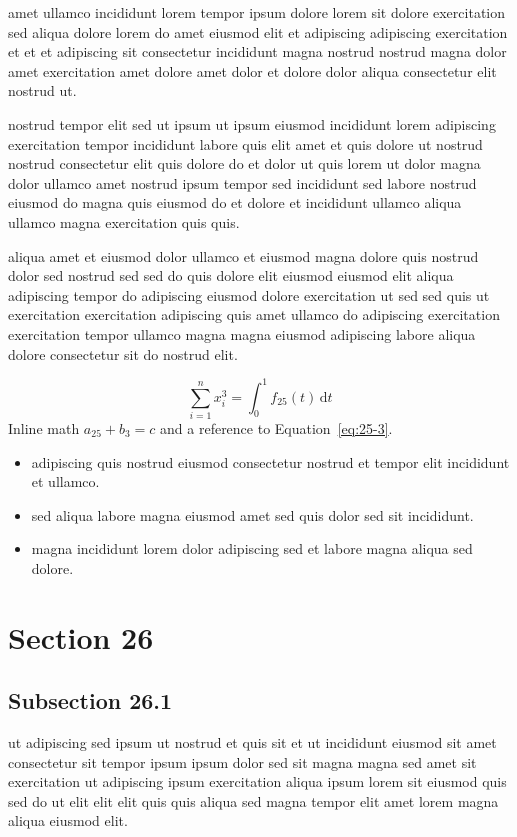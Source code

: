 \documentclass{article}
\begin{document}
amet ullamco incididunt lorem tempor ipsum dolore lorem sit dolore exercitation sed aliqua dolore lorem do amet eiusmod elit et adipiscing adipiscing exercitation et et et adipiscing sit consectetur incididunt magna nostrud nostrud magna dolor amet exercitation amet dolore amet dolor et dolore dolor aliqua consectetur elit nostrud ut.

nostrud tempor elit sed ut ipsum ut ipsum eiusmod incididunt lorem adipiscing exercitation tempor incididunt labore quis elit amet et quis dolore ut nostrud nostrud consectetur elit quis dolore do et dolor ut quis lorem ut dolor magna dolor ullamco amet nostrud ipsum tempor sed incididunt sed labore nostrud eiusmod do magna quis eiusmod do et dolore et incididunt ullamco aliqua ullamco magna exercitation quis quis.

aliqua amet et eiusmod dolor ullamco et eiusmod magna dolore quis nostrud dolor sed nostrud sed sed do quis dolore elit eiusmod eiusmod elit aliqua adipiscing tempor do adipiscing eiusmod dolore exercitation ut sed sed quis ut exercitation exercitation adipiscing quis amet ullamco do adipiscing exercitation exercitation tempor ullamco magna magna eiusmod adipiscing labore aliqua dolore consectetur sit do nostrud elit.

\begin{equation}\label{eq:25-3}
  \sum_{i=1}^{n} x_i^{3} = \int_0^1 f_{25}(t)\,\mathrm{d}t
\end{equation}
Inline math $a_{25} + b_{3} = c$ and a reference to Equation~\eqref{eq:25-3}.

\begin{itemize}
  \item adipiscing quis nostrud eiusmod consectetur nostrud et tempor elit incididunt et ullamco.
  \item sed aliqua labore magna eiusmod amet sed quis dolor sed sit incididunt.
  \item magna incididunt lorem dolor adipiscing sed et labore magna aliqua sed dolore.
\end{itemize}

\section{Section 26}\label{sec:26}
\subsection{Subsection 26.1}\label{sec:26-1}
ut adipiscing sed ipsum ut nostrud et quis sit et ut incididunt eiusmod sit amet consectetur sit tempor ipsum ipsum dolor sed sit magna magna sed amet sit exercitation ut adipiscing ipsum exercitation aliqua ipsum lorem sit eiusmod quis sed do ut elit elit elit quis quis aliqua sed magna tempor elit amet lorem magna aliqua eiusmod elit.
\end{document}
